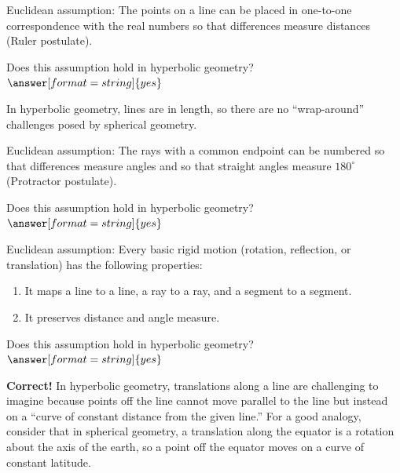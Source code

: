\documentclass{ximera}
\begin{document}
\begin{problem} %
Euclidean assumption:  The points on a line can be placed in one-to-one correspondence with the real numbers so that differences measure distances (Ruler postulate).  

Does this assumption hold in hyperbolic geometry? 
$\answer[format=string]{yes}$
\begin{feedback}[correct]
In hyperbolic geometry, lines are  in length, so there are no ``wrap-around'' challenges posed by spherical geometry.  
\end{feedback}
\end{problem}

\begin{problem} %
Euclidean assumption:  The rays with a common endpoint can be numbered so that differences measure angles and so that straight angles measure $180^\circ$ (Protractor postulate).  

Does this assumption hold in hyperbolic geometry? 
$\answer[format=string]{yes}$
\end{problem}

\begin{problem} %
Euclidean assumption: Every basic rigid motion (rotation, reflection, or translation) has the following properties: 
\begin{enumerate}
\item It maps a line to a line, a ray to a ray, and a segment to a segment.
\item It preserves distance and angle measure.
\end{enumerate}

Does this assumption hold in hyperbolic geometry? 
$\answer[format=string]{yes}$
\begin{feedback}[correct]
\textbf{Correct!} In hyperbolic geometry, translations along a line are challenging to imagine because points off the line cannot move parallel to the line but instead on a ``curve of constant distance from the given line.''  For a good analogy, consider that in spherical geometry, a translation along the equator is a rotation about the axis of the earth, so a point off the equator moves on a curve of constant latitude.
\end{feedback}
\end{problem}
\end{document}
